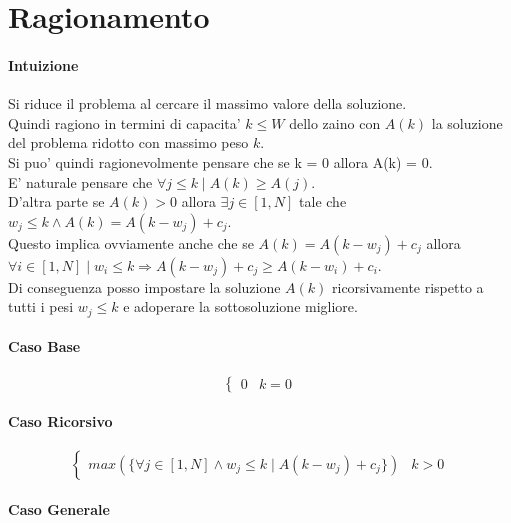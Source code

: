 \section{Ragionamento}

\paragraph{Intuizione}

Si riduce il problema al cercare il massimo valore della soluzione. \\
Quindi ragiono in termini di capacita' $k \leq W$ dello zaino con $A(k)$ la soluzione del problema ridotto con massimo peso $k$. \\
Si puo' quindi ragionevolmente pensare che se k = 0 allora A(k) = 0. \\
E' naturale pensare che $\forall j \leq k \mid A(k) \geq A(j)$. \\
D'altra parte se $A(k) > 0$ allora $\exists j \in [1,N]$ tale che $w_j \leq k \land A(k) = A(k-w_j) + c_j$. \\
Questo implica ovviamente anche che se $A(k) = A(k-w_j) + c_j$ allora $\forall i \in [1,N] \mid w_i \leq k \Rightarrow A(k-w_j) + c_j \geq A(k-w_i) + c_i$. \\
Di conseguenza posso impostare la soluzione $A(k)$ ricorsivamente rispetto a tutti i pesi $w_j \leq k$ e adoperare la sottosoluzione migliore.

\paragraph{Caso Base}

\[
    \begin{cases}
        \text{$0$} & \text{$k = 0$}
    \end{cases}
\]

\paragraph{Caso Ricorsivo}

\[
    \begin{cases}
        \text{$max(\{\forall j \in [1,N] \land w_j \leq k \mid A(k - w_j) + c_j\})$} & \text{$k > 0$}
    \end{cases}
\]

\paragraph{Caso Generale}

